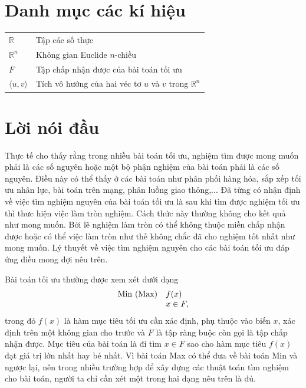 \documentclass[12pt,a4paper]{report}
\begin{document}
	\vspace{1cm}
	\newpage
	
	\tableofcontents
	\chapter*{Danh mục các kí hiệu}
	\thispagestyle{fancy}
	\begin{longtable}{l l}
		
		$\mathbb{R}$ & Tập các số thực\\
		$\mathbb{R}^n$ & Không gian Euclide $n$-chiều\\

		
		$F$ & Tập chấp nhận được của bài toán tối ưu\\
		$\langle u, v \rangle$ & Tích vô hướng của hai véc tơ $u$ và $v$ trong $\mathbb{R}^n$\\
		
		
	\end{longtable}
\newpage
{} 
\chapter*{Lời nói đầu}
\thispagestyle{fancy}
\renewcommand{\baselinestretch}{1.2}
Thực tế cho thấy rằng trong nhiều bài toán tối ưu, nghiệm tìm được mong muốn phải là các số nguyên hoặc một bộ phận nghiệm của bài toán phải là các số nguyên. Điều này có thể thấy ở các bài toán như phân phối hàng hóa, sắp xếp tối ưu nhân lực, bài toán trên mạng, phân luồng giao thông,...
Đã từng có nhận định về việc tìm nghiệm nguyên của bài toán tối ưu là sau khi tìm được nghiệm tối ưu thì thưc hiện việc làm tròn nghiệm. Cách thức này thường không cho kết quả như mong muốn. Bởi lẽ nghiệm làm tròn có thể không thuộc miền chấp nhận được hoặc  có thể việc làm tròn như thế không chắc đã cho nghiệm tốt nhất như mong muốn. Lý thuyết về việc tìm nghiệm nguyên cho các bài toán tối ưu đáp ứng điều mong đợi nêu trên.

Bài toán tối ưu thường được xem xét dưới dạng 
$$
\begin{array}{ll}
{\rm Min\ (Max)}& f(x)\\
&x \in F,
\end{array}
$$
trong đó $f(x)$ là hàm mục tiêu tối ưu cần xác định, phụ thuộc vào biến $x$, xác định trên một không gian cho trước và $F$ là tập ràng buộc còn gọi là tập chấp nhận được. Mục tiêu của bài toán là đi tìm $x\in F$ sao cho hàm mục tiêu $f(x)$ đạt giá trị lớn nhất hay bé nhất.
Vì bài toán Max có thể đưa về bài toán Min và ngược lại, nên trong nhiều trường hợp để xây dựng các thuật toán tìm nghiệm cho bài toán, người ta chỉ cần xét một trong hai dạng nêu trên là đủ.
\end{document}
